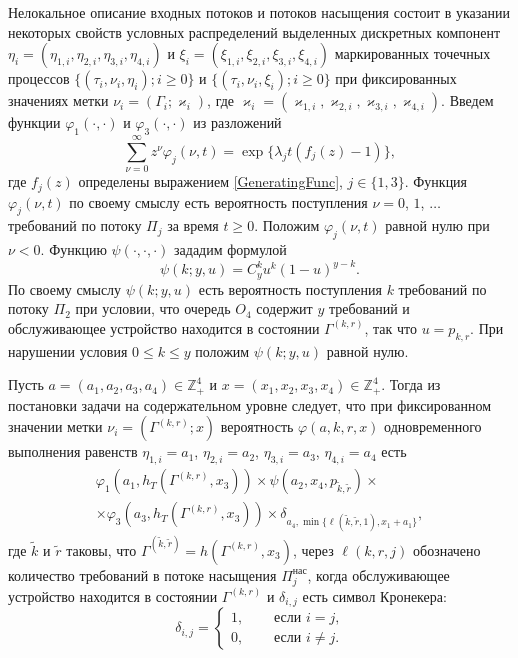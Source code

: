 \documentclass[11pt]{ubs}
\begin{document}
Нелокальное описание входных потоков и потоков насыщения состоит в указании некоторых свойств условных распределений выделенных дискретных компонент $\eta_i=(\eta_{1,i},\eta_{2,i}, \eta_{3,i}, \eta_{4,i})$ и $\xi_i=(\xi_{1,i}, \xi_{2,i}, \xi_{3,i}, \xi_{4,i})$ маркированных точечных процессов \linebreak $\{(\tau_i, \nu_i, \eta_i); i\geqslant 0\}$ и $\{(\tau_i, \nu_i, \xi_i); i\geqslant 0\}$ при фиксированных значениях метки $\nu_i = (\Gamma_i;\varkappa_i)$, где $\varkappa_i=(\varkappa_{1,i},\varkappa_{2,i},\varkappa_{3,i},\varkappa_{4,i})$. 
Введем функции $\varphi_1(\cdot,\cdot)$ и $\varphi_3(\cdot,\cdot)$ из разложений 
\begin{equation*}
\sum_{\nu=0}^{\infty} z^\nu\varphi_j(\nu,t) = \exp\{\lambda_j t (f_j(z)-1)\},
\end{equation*}
где $f_j(z)$ определены выражением \eqref{GeneratingFunc}, $j \in \{1,3\}$. Функция $\varphi_j(\nu,t)$ по своему смыслу есть вероятность поступления $\nu=0$, $1$, $\ldots$ требований по потоку $\Pi_j$ за время $t \geqslant 0$. Положим $\varphi_j(\nu,t)$ равной нулю при $\nu < 0$. Функцию $\psi(\cdot,\cdot,\cdot)$ зададим формулой
\begin{equation*}
\psi(k;y,u)=C_y^k u^k (1-u)^{y-k}.	
\end{equation*}
По своему смыслу $\psi(k;y,u)$ есть вероятность поступления $k$ требований по потоку $\Pi_2$ при условии, что очередь $O_4$ содержит $y$ требований и обслуживающее устройство находится в состоянии $\Gamma^{(k,r)}$, так что $u=p_{k,r}$. При нарушении условия $ 0\leqslant k \leqslant y$ положим $\psi(k;y,u)$ равной нулю.

Пусть $a=(a_1, a_2, a_3, a_4) \in \mathbb{Z}_+^4$ и $x=(x_1, x_2, x_3, x_4) \in \mathbb{Z}_+^4$. Тогда из постановки задачи на содержательном уровне следует, что при фиксированном значении метки $\nu_i=(\Gamma^{(k,r)}; x)$ вероятность $\varphi(a,k,r,x)$ одновременного выполнения равенств $\eta_{1,i}=a_1$, $\eta_{2,i}=a_2$, $\eta_{3,i}=a_3$, $\eta_{4,i}=a_4$ есть 
\begin{multline*}
\varphi_1(a_1,h_T(\Gamma^{(k,r)},x_3)) \times \psi(a_2,x_4, p_{\tilde{k},\tilde{r}}) \times \\ \times \varphi_3(a_3,h_T(\Gamma^{(k,r)},x_3))
\times \delta_{a_4,\min{\{\ell(\tilde{k},\tilde{r},1), x_1+a_1}\}},
\end{multline*}
где $\tilde{k}$ и $\tilde{r}$ таковы, что $\Gamma^{(\tilde{k},\tilde{r})}=h(\Gamma^{(k,r)},x_3)$, 
через $\ell(k,r,j)$ обозначено количество требований в потоке насыщения $\Pi^{\text{нас}}_j$, когда обслуживающее устройство находится в состоянии $\Gamma^{(k,r)}$ и
$\delta_{i,j}$ есть символ Кронекера:
$$
\delta_{i,j}=
\begin{cases} 
1,& \quad \text{ если $i=j$,}\\
0,& \quad \text{ если $i\neq j$.}
\end{cases}
$$%
 
\end{document}
